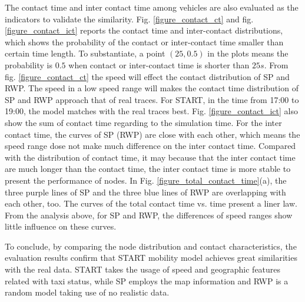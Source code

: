 The contact time and inter contact time among vehicles are also evaluated as the indicators to validate the similarity.
Fig. \ref{figure_contact_ct} and fig. \ref{figure_contact_ict} reports the contact time and inter-contact distributions, which shows the probability of the contact or inter-contact time smaller than certain time length. To substantiate, a point $(25,0.5)$ in the plots means the probability is $0.5$ when contact or inter-contact time is shorter than $25s$. 
From fig. \ref{figure_contact_ct} the speed will effect the contact distribution of SP and RWP. The speed in a low speed range will makes the contact time distribution of SP and RWP approach that of real traces. For START, in the time from 17:00 to 19:00, the model matches with the real traces best. 
Fig. \ref{figure_contact_ict} also show the sum of contact time regarding to the simulation time.
For the inter contact time, the curves of SP (RWP) are close with each other, which means the speed range dose not make much difference on the inter contact time. Compared with the distribution of contact time, it may because that the inter contact time are much longer than the contact time, the inter contact time is more stable to present the performance of nodes. 
In Fig. \ref{figure_total_contact_time}(a), the three purple lines of SP and the three blue lines of RWP are overlapping with each other, too.
The curves of the total contact time vs. time present a liner law. 
From the analysis above, for SP and RWP, the differences of speed ranges show little influence on these curves. 

To conclude, by comparing the node distribution and contact characteristics, the evaluation results confirm that START mobility model achieves great similarities with the real data. START takes the usage of speed and geographic features related with taxi status, while SP employs the map information and RWP is a random model taking use of no realistic data.

